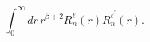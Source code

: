 \begin{equation}
\int_{0}^{\infty }dr\,r^{\beta +2}R_{n}^{\ell }\left( r\right) R_{n}^{\ell
^{\prime }}\left( r\right) .
\end{equation}

